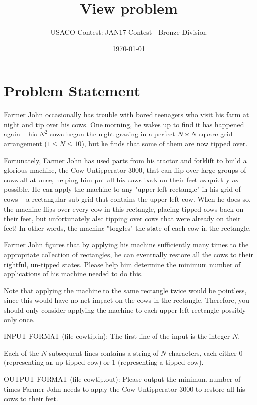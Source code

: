 \documentclass[12pt]{article}
\title{View problem}
\author{USACO Contest: JAN17 Contest - Bronze Division}
\date{\today}
\begin{document}
\maketitle

\section*{Problem Statement}

Farmer John occasionally has trouble with bored teenagers who visit his farm at
night and tip over his cows.  One morning, he wakes up to find it has happened
again -- his $N^2$ cows  began the night grazing in a perfect $N \times N$
square grid arrangement ($1 \leq N \leq 10$), but he finds that some of them are
now tipped over.  

Fortunately, Farmer John has used parts from his tractor and forklift to build a
glorious machine, the Cow-Untipperator 3000, that can flip over large groups of
cows all at once, helping him put all his cows back on their feet as quickly as
possible.  He can apply the machine to any "upper-left rectangle" in his grid of
cows -- a rectangular sub-grid that contains the upper-left cow.  When he does
so, the machine flips over every cow in this rectangle,  placing tipped cows
back on their feet, but unfortunately also tipping over cows that were already
on their feet!  In other words, the machine "toggles" the state of each cow in
the rectangle.

Farmer John figures that by applying his machine sufficiently many times to the
appropriate collection of rectangles, he can eventually restore all the cows to
their rightful, un-tipped states.  Please help him determine the minimum number
of applications of his machine needed to do this.  

Note that applying the machine to the same rectangle twice would be pointless,
since this would have no net impact on the cows in the rectangle.  Therefore,
you should only consider applying the machine to each upper-left rectangle
possibly only once.

INPUT FORMAT (file cowtip.in):
The first line of the input is the integer $N$.

Each of the $N$ subsequent lines contains a string of $N$ characters, each
either 0 (representing an up-tipped cow) or 1 (representing a tipped cow).

OUTPUT FORMAT (file cowtip.out):
Please output the minimum number of times Farmer John needs to apply the
Cow-Untipperator 3000 to restore all his cows to their feet.
\end{document}
